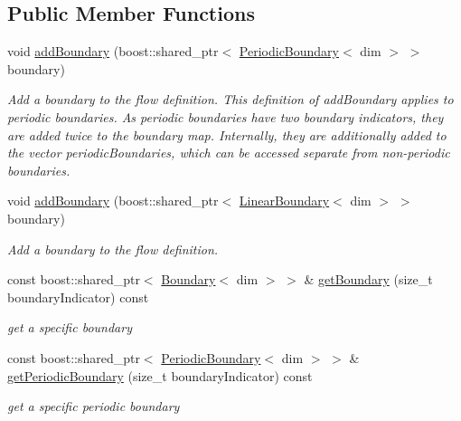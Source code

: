 \subsection*{Public Member Functions}
\begin{DoxyCompactItemize}
\item 
void \hyperlink{classnatrium_1_1BoundaryCollection_a9f957b5338bca01c7bd8c21576ec922c}{addBoundary} (boost::shared\_\-ptr$<$ \hyperlink{classnatrium_1_1PeriodicBoundary}{PeriodicBoundary}$<$ dim $>$ $>$ boundary)
\begin{DoxyCompactList}\small\item\em Add a boundary to the flow definition. This definition of addBoundary applies to periodic boundaries. As periodic boundaries have two boundary indicators, they are added twice to the boundary map. Internally, they are additionally added to the vector periodicBoundaries, which can be accessed separate from non-\/periodic boundaries. \item\end{DoxyCompactList}\item 
void \hyperlink{classnatrium_1_1BoundaryCollection_a34251a8325b51b6a7c82414a08a79914}{addBoundary} (boost::shared\_\-ptr$<$ \hyperlink{classnatrium_1_1LinearBoundary}{LinearBoundary}$<$ dim $>$ $>$ boundary)
\begin{DoxyCompactList}\small\item\em Add a boundary to the flow definition. \item\end{DoxyCompactList}\item 
const boost::shared\_\-ptr$<$ \hyperlink{classnatrium_1_1Boundary}{Boundary}$<$ dim $>$ $>$ \& \hyperlink{classnatrium_1_1BoundaryCollection_a44816fa48b8100fb37b8ad7491c2cc6c}{getBoundary} (size\_\-t boundaryIndicator) const 
\begin{DoxyCompactList}\small\item\em get a specific boundary \item\end{DoxyCompactList}\item 
const boost::shared\_\-ptr$<$ \hyperlink{classnatrium_1_1PeriodicBoundary}{PeriodicBoundary}$<$ dim $>$ $>$ \& \hyperlink{classnatrium_1_1BoundaryCollection_aea0ba68a319b3ec0f3774ba814e18217}{getPeriodicBoundary} (size\_\-t boundaryIndicator) const 
\begin{DoxyCompactList}\small\item\em get a specific periodic boundary \item\end{DoxyCompactList}\item 

\end{DoxyCompactItemize}
